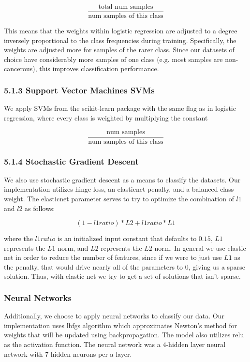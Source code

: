 \documentclass[12pt]{scrartcl}
\begin{document}
    $$\frac{\textrm{total num samples}}{\textrm{num samples of this class}}$$
    
    This means that the weights within logistic regression are adjusted to a degree inversely proportional to the class frequencies during training. Specifically, the weights are adjusted more for samples of the rarer class. Since our datasets of choice have considerably more samples of one class (e.g. most samples are non-cancerous), this improves classification performance.
    
    \subsubsection*{5.1.3 Support Vector Machines SVMs}
    We apply SVMs from the scikit-learn package with the same flag as in logistic regression, where every class is weighted by multiplying the constant
    
    $$\frac{\textrm{num samples}}{\textrm{num samples of this class}}$$
    
    \subsubsection*{5.1.4 Stochastic Gradient Descent}
    We also use stochastic gradient descent as a means to classify the datasets. Our implementation utilizes hinge loss, an elasticnet penalty, and a balanced class weight. The elasticnet parameter serves to try to optimize the combination of $l1$ and $l2$ as follows:
    
    $$(1-l1ratio)*L2 +l1ratio*L1$$
    
    where the $l1ratio$ is an initialized input constant that defaults to $0.15$, $L1$ represents the $L1$ norm, and $L2$ represents the $L2$ norm. In general we use elastic net in order to reduce the number of features, since if we were to just use $L1$ as the penalty, that would drive nearly all of the parameters to $0$, giving us a sparse solution. Thus, with elastic net we try to get a set of solutions that isn't sparse.
    
    \subsubsection{Neural Networks}
    Additionally, we choose to apply neural networks to classify our data. Our implementation uses lbfgs algorithm which approximates Newton's method for weights that will be updated using backpropagation. The model also utilizes relu as the activation function. The neural network was a 4-hidden layer neural network with 7 hidden neurons per a layer. 
    
\end{document}
